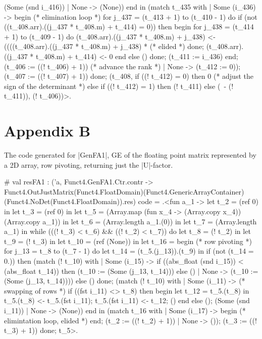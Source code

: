 \documentclass{llncs}
\begin{document}
\begin{code2}
          (Some (snd i_416))
       | None -> (None))
     end in
    (match t_435 with
     | Some (i_436) ->
        begin (* elimination loop *)
         for j_437 = (t_413 + 1) to (t_410 - 1) do
          if (not ((t_408.arr).((j_437 * t_408.m) + t_414) = 0)) then begin
           for j_438 = (t_414 + 1) to (t_409 - 1) do
            (t_408.arr).((j_437 * t_408.m) + j_438) <-
             ((((t_408.arr).((j_437 * t_408.m) + j_438) * (* elided *)
           done;
           (t_408.arr).((j_437 * t_408.m) + t_414) <- 0
          end else ()
         done; (t_411 := i_436)
        end;
        (t_406 := ((! t_406) + 1)) (* advance the rank *)
     | None -> (t_412 := 0));
    (t_407 := ((! t_407) + 1))
   done;
   (t_408, 
    if ((! t_412) = 0) then 0 (* adjust the sign of the determinant *)
    else if ((! t_412) = 1) then (! t_411)
    else (~- (! t_411)), (! t_406))>.
\end{code2}
\section{Appendix B}
The code generated for |GenFA1|, GE of the floating point matrix
represented by a 2D array, row pivoting, returning just the |U|-factor.
\begin{code2}
# val resFA1 : ('a,
   Funct4.GenFA1.Ctr.contr ->
   Funct4.OutJustMatrix(Funct4.FloatDomain)(Funct4.GenericArrayContainer)
                       (Funct4.NoDet(Funct4.FloatDomain)).res) code =
  .<fun a_1 ->
   let t_2 = (ref 0) in let t_3 = (ref 0) in
   let t_5 = (Array.map (fun x_4 -> (Array.copy x_4)) (Array.copy a_1)) in
   let t_6 = (Array.length a_1.(0)) in
   let t_7 = (Array.length a_1) in
   while (((! t_3) < t_6) && ((! t_2) < t_7)) do
    let t_8 = (! t_2) in let t_9 = (! t_3) in
    let t_10 = (ref (None)) in
    let t_16 =
     begin  (* row pivoting *)
      for j_13 = t_8 to (t_7 - 1) do
       let t_14 = (t_5.(j_13)).(t_9) in
       if (not (t_14 = 0.)) then
        (match (! t_10) with
         | Some (i_15) ->
            if ((abs_float (snd i_15)) < (abs_float t_14)) then
             (t_10 := (Some (j_13, t_14)))
            else ()
         | None -> (t_10 := (Some (j_13, t_14))))
       else ()
      done;
      (match (! t_10) with
       | Some (i_11) -> (* swapping of rows *)
          if ((fst i_11) <> t_8) then begin
           let t_12 = t_5.(t_8) in
           t_5.(t_8) <- t_5.(fst i_11);
           t_5.(fst i_11) <- t_12; () end else ();
          (Some (snd i_11))
       | None -> (None))
     end in
    (match t_16 with
     | Some (i_17) ->
        begin (* elimintation loop, elided *) end;
        (t_2 := ((! t_2) + 1))
     | None -> ());
    (t_3 := ((! t_3) + 1))
   done;
   t_5>.
\end{code2}
\end{document}

